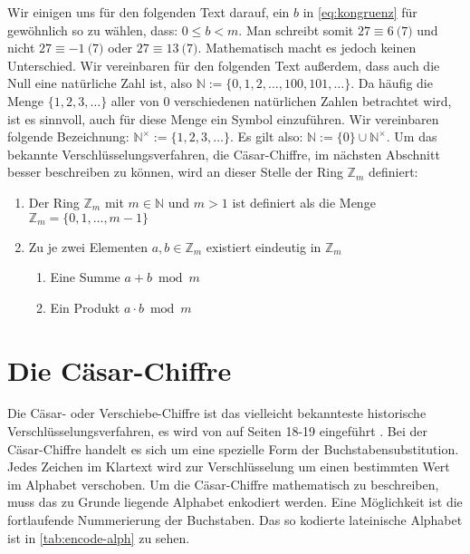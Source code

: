 \noindent
Wir einigen uns für den folgenden Text darauf, ein $b$ in
\eqref{eq:kongruenz} für gewöhn\-lich so zu wählen, dass: $0 \leq b < m$.
Man schreibt somit $27 \equiv 6 \pod{7}$ und nicht $27 \equiv -1 \pod{7}$
oder $27 \equiv 13 \pod{7}$.
Mathematisch macht es jedoch keinen Unterschied.
Wir vereinbaren für den folgenden Text außerdem, dass auch die Null eine natürliche Zahl ist,
also $\mathbb{N} := \{0,1,2,\dots, 100, 101, \dots\}$. Da häufig die Menge
$\{1,2,3,\dots\}$ aller von 0 verschiedenen natürlichen Zahlen betrachtet wird, ist
es sinnvoll, auch für diese Menge ein Symbol einzuführen. Wir vereinbaren folgende
Bezeichnung: $\mathbb{N}^\times := \{1,2,3,\dots\}$.
Es gilt also: $\mathbb{N} := \{0\} \cup \mathbb{N}^\times$.
Um das bekannte Verschlüsselungsverfahren, die Cäsar-Chiffre, im nächsten Abschnitt
besser beschreiben zu können, wird an dieser Stelle der Ring $\mathbb{Z}_m$ definiert:
\newpage

\begin{definition}[Der Ring $\mathbb{Z}_m$ der Reste Modulo $m$]
  \leavevmode
  \begin{enumerate}
    \item Der Ring $\mathbb{Z}_m$ mit $m \in \mathbb{N}$ und $m > 1$ ist
          definiert als die Menge $\mathbb{Z}_m = \{0,1,\dots,m - 1\}$
    \item Zu je zwei Elementen $a,b \in \mathbb{Z}_m$ existiert eindeutig in $\mathbb{Z}_m$
          \begin{enumerate}[topsep=0pt]
            \item Eine Summe $a + b \bmod{m}$
            \item Ein Produkt $a \cdot b \bmod{m}$
          \end{enumerate}
  \end{enumerate}
\end{definition}

\section{Die Cäsar-Chiffre} \label{sec:shift-cipher}
Die Cäsar- oder Verschiebe-Chiffre ist das vielleicht bekannteste historische Verschlüs\-selungsverfahren,
es wird von \citeauthor{BOOK:crypto} auf Seiten 18-19 eingeführt \parencite*{BOOK:crypto}.
Bei der Cäsar-Chiffre handelt es sich um eine spezielle Form der Buchstabensubstitution.
Jedes Zeichen im Klartext wird zur Verschlüsselung um einen bestimmten Wert
im Alphabet verschoben.
Um die Cäsar-Chiffre mathematisch zu
beschreiben, muss das zu Grunde liegende Alphabet enkodiert werden.
Eine Möglichkeit ist die fortlaufende Nummerierung der Buchstaben. Das so kodierte
lateinische Alphabet ist in \autoref{tab:encode-alph} zu sehen.

